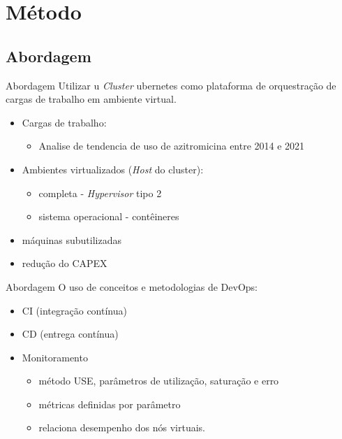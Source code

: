 \documentclass[10pt,brazil]{beamer}
\theoremstyle{definition}
\begin{document}
\section{Método}

\subsection{Abordagem}
\begin{frame}[allowframebreaks]{Abordagem}
  Utilizar u \emph{Cluster} ubernetes como plataforma de orquestração de cargas de trabalho em ambiente virtual.
  \begin{itemize}
    \item Cargas de trabalho:
          \begin{itemize}
            \item Analise de tendencia de uso de azitromicina entre 2014 e 2021
          \end{itemize}
        \item Ambientes virtualizados (\emph{Host} do cluster):
          \begin{itemize}
            \item completa - \emph{Hypervisor} tipo 2
            \item sistema operacional - contêineres
        \end{itemize}
    
        \item máquinas subutilizadas
        \item redução do CAPEX
    \end{itemize}
\end{frame}

\begin{frame}{Abordagem}
  O uso de conceitos e metodologias de DevOps:
  \begin{itemize}
            \item CI (integração contínua)
            \item CD (entrega contínua)
    \item Monitoramento
        \begin{itemize}
            \item método USE, parâmetros de utilização, saturação e erro 
            \item métricas definidas por parâmetro
            \item relaciona desempenho dos nós virtuais.
        \end{itemize}
  \end{itemize}
\end{frame}
\end{document}
